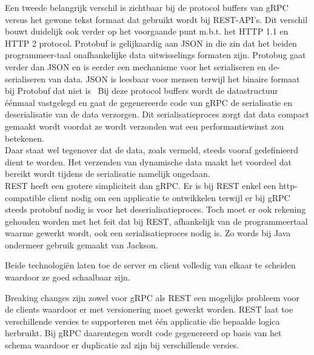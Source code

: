 Een tweede belangrijk verschil is zichtbaar bij de protocol buffers van gRPC versus het gewone tekst formaat dat gebruikt wordt bij REST-API's.
Dit verschil bouwt duidelijk ook verder op het voorgaande punt m.b.t. het HTTP 1.1 en HTTP 2 protocol.
Protobuf is gelijkaardig aan JSON in die zin dat het beiden programmeer-taal onafhankelijke data uitwisselings formaten zijn.
Protobug gaat verder dan JSON en is eerder een mechanisme voor het serialiseren en de-serialiseren van data.
JSON is leesbaar voor mensen terwijl het binaire formaat bij Protobuf dat niet is~\parencite{json}
Bij deze protocol buffers wordt de datastructuur éénmaal vastgelegd en gaat de gegenereerde code van gRPC de serialisatie en deserialisatie van de data verzorgen.
Dit serialisatieproces zorgt dat data compact gemaakt wordt voordat ze wordt verzonden wat een performantiewinst zou betekenen.\newline
~\autocite{googleprotobufguide}\\

Daar staat wel tegenover dat de data, zoals vermeld, steeds vooraf gedefinieerd dient te worden.
Het verzenden van dynamische data maakt het voordeel dat bereikt wordt tijdens de serialisatie namelijk ongedaan.\\

REST heeft een grotere simpliciteit dan gRPC. Er is bij REST enkel een http-compatible client nodig om een applicatie te ontwikkelen terwijl
er bij gRPC steeds protobuf nodig is voor het deserialisatieproces. Toch moet er ook rekening gehouden worden met het feit dat bij REST,
afhankelijk van de programmeertaal waarme gewerkt wordt, ook een serialisatieproces nodig is. Zo words bij Java ondermeer gebruik gemaakt van Jackson.\newline
~\autocite{jackson}

Beide technologiën laten toe de server en client volledig van elkaar te scheiden waardoor ze goed schaalbaar zijn.

Breaking changes zijn zowel voor gRPC als REST een mogelijks probleem voor de clients waardoor er met versionering moet gewerkt worden.
REST laat toe verschillende versies te supporteren met één applicatie die bepaalde logica herbruikt. Bij gRPC daarentegen wordt code gegenereerd op basis van
het schema waardoor er duplicatie zal zijn bij verschillende versies.\newline
~\autocite{grpcversion}

